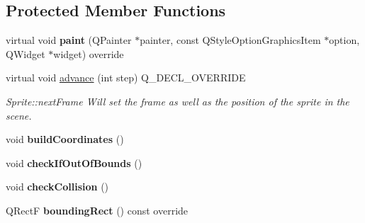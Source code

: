\subsection*{Protected Member Functions}
\begin{DoxyCompactItemize}
\item 
\mbox{\label{class_sprite_a73230a5034b8d9091a3e31fbdd3b0d46}} 
virtual void {\bfseries paint} (Q\+Painter $\ast$painter, const Q\+Style\+Option\+Graphics\+Item $\ast$option, Q\+Widget $\ast$widget) override
\item 
\mbox{\label{class_sprite_a48de16f5c8661ef4700ab7a411aebded}} 
virtual void \hyperlink{class_sprite_a48de16f5c8661ef4700ab7a411aebded}{advance} (int step) Q\+\_\+\+D\+E\+C\+L\+\_\+\+O\+V\+E\+R\+R\+I\+DE
\begin{DoxyCompactList}\small\item\em Sprite\+::next\+Frame Will set the frame as well as the position of the sprite in the scene. \end{DoxyCompactList}\item 
\mbox{\label{class_sprite_a0af8ed7bce1d1dde0a2c01f9461d4b4f}} 
void {\bfseries build\+Coordinates} ()
\item 
\mbox{\label{class_sprite_aefcdf13598b88f1ad0a4bfd797815b3b}} 
void {\bfseries check\+If\+Out\+Of\+Bounds} ()
\item 
\mbox{\label{class_sprite_aaa1b06057132ee51960b783635cfec44}} 
void {\bfseries check\+Collision} ()
\item 
\mbox{\label{class_sprite_a642055fcd741b2c205a9a1359ce0b30f}} 
Q\+RectF {\bfseries bounding\+Rect} () const override
\end{DoxyCompactItemize}
